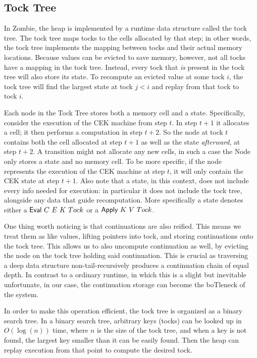 \subsection{Tock Tree}
In Zombie, the heap is implemented by a runtime data structure called the tock tree. The tock tree maps tocks to the cells allocated by that step; in other words, the tock tree implements the mapping between tocks and their actual memory locations. Because values can be evicted to save memory, however, not all tocks have a mapping in the tock tree. Instead, every tock that \emph{is} present in the tock tree will also store its state. To recompute an evicted value at some tock $i$, the tock tree will find the largest state at tock $j < i$ and replay from that tock to tock $i$.

Each node in the Tock Tree stores both a memory cell and a state. Specifically, consider the execution of the CEK machine from step $t$. In step $t + 1$ it allocates a cell; it then performs a computation in step $t + 2$. So the node at tock $t$ contains both the cell allocated at step $t + 1$ as well as the state \emph{afterward}, at step $t + 2$. A transition might not allocate any new cells, in such a case the Node only stores a state and no memory cell. To be more specific, if the node represents the execution of the CEK machine at step $t$, it will only contain the CEK state at step $t + 1$. Also note that a state, in this context, does not include every info needed for execution: in particular it does not include the tock tree, alongside any data that guide recomputation. More specifically a state denotes either a $\text{\textsf{Eval}}~C~E~K~Tock$ or a $\text{\textsf{Apply}}~K~V~Tock$.

One thing worth noticing is that continuations are also reified. This means we treat them as like values, lifting pointers into tock, and storing continuations onto the tock tree. This allows us to also uncompute continuation as well, by evicting the node on the tock tree holding said continuation. This is crucial as traversing a deep data structure non-tail-recursively produces a continuation chain of equal depth. In contrast to a ordinary runtime, in which this is a slight but inevitable unfortunate, in our case, the continuation storage can become the boTleneck of the system.

In order to make this operation efficient, the tock tree is organized as a binary search tree. In a binary search tree, arbitrary keys (tocks) can be looked up in $O(\log(n))$ time, where $n$ is the size of the tock tree, and when a key is not found, the largest key smaller than it can be easily found. Then the heap can replay execution from that point to compute the desired tock.

